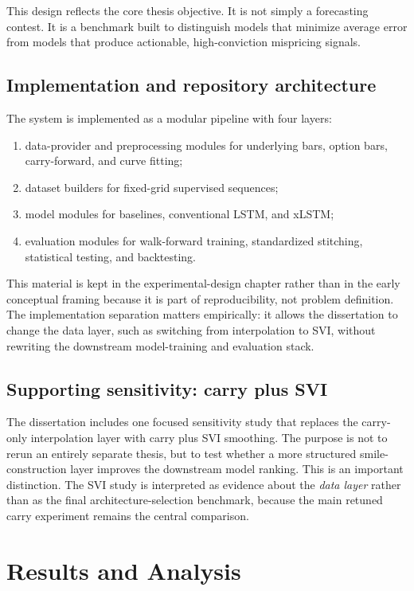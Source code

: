 \documentclass[12pt]{report}
\begin{document}
This design reflects the core thesis objective. It is not simply a forecasting contest. It is a benchmark built to distinguish models that minimize average error from models that produce actionable, high-conviction mispricing signals.

\section{Implementation and repository architecture}
The system is implemented as a modular pipeline with four layers:
\begin{enumerate}[leftmargin=1.2cm]
    \item data-provider and preprocessing modules for underlying bars, option bars, carry-forward, and curve fitting;
    \item dataset builders for fixed-grid supervised sequences;
    \item model modules for baselines, conventional LSTM, and xLSTM;
    \item evaluation modules for walk-forward training, standardized stitching, statistical testing, and backtesting.
\end{enumerate}

This material is kept in the experimental-design chapter rather than in the early conceptual framing because it is part of reproducibility, not problem definition. The implementation separation matters empirically: it allows the dissertation to change the data layer, such as switching from interpolation to SVI, without rewriting the downstream model-training and evaluation stack.

\section{Supporting sensitivity: carry plus SVI}
The dissertation includes one focused sensitivity study that replaces the carry-only interpolation layer with carry plus SVI smoothing. The purpose is not to rerun an entirely separate thesis, but to test whether a more structured smile-construction layer improves the downstream model ranking. This is an important distinction. The SVI study is interpreted as evidence about the \emph{data layer} rather than as the final architecture-selection benchmark, because the main retuned carry experiment remains the central comparison.

\chapter{Results and Analysis}
\end{document}
